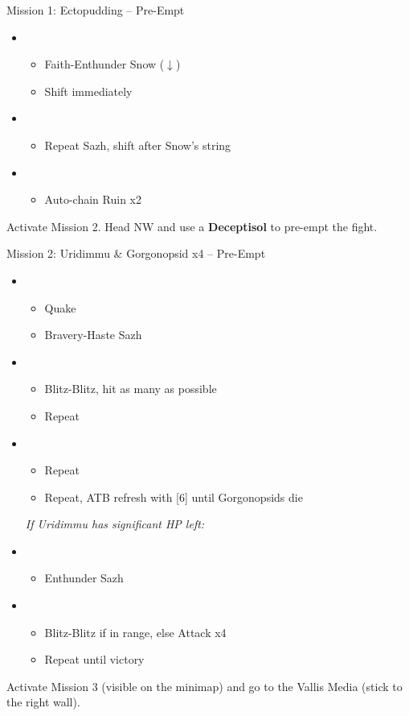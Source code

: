 \begin{battle}{Mission 1: Ectopudding -- Pre-Empt}
	\begin{itemize}
		\item \third
			\begin{itemize}
				\item Faith-Enthunder Snow ($\downarrow$)
				\item Shift immediately
			\end{itemize}
		\item \fourth
			\begin{itemize}
				\item Repeat Sazh, shift after Snow's string
			\end{itemize}
		\item \fifth
			\begin{itemize}
				\item Auto-chain Ruin x2
			\end{itemize}
	\end{itemize}
\end{battle}

Activate Mission 2.
Head NW and use a \textbf{Deceptisol} to pre-empt the fight.

\begin{battle}{Mission 2: Uridimmu \& Gorgonopsid x4 -- Pre-Empt}
	\begin{itemize}
		\item \third
			\begin{itemize}
				\item Quake
				\item Bravery-Haste Sazh
			\end{itemize}
		\item \sixth
			\begin{itemize}
				\item Blitz-Blitz, hit as many as possible
				\item Repeat
			\end{itemize}
		\item \first
			\begin{itemize}
				\item Repeat
				\item Repeat, ATB refresh with [6] until Gorgonopsids die
			\end{itemize}
		\textit{If Uridimmu has significant HP left:}
		\item \fourth
			\begin{itemize}
				\item Enthunder Sazh
			\end{itemize}
		\item \sixth
			\begin{itemize}
				\item Blitz-Blitz if in range, else Attack x4
				\item Repeat until victory
			\end{itemize}
	\end{itemize}
\end{battle}

Activate Mission 3 (visible on the minimap) and go to the Vallis Media (stick to the right wall).
\vfill